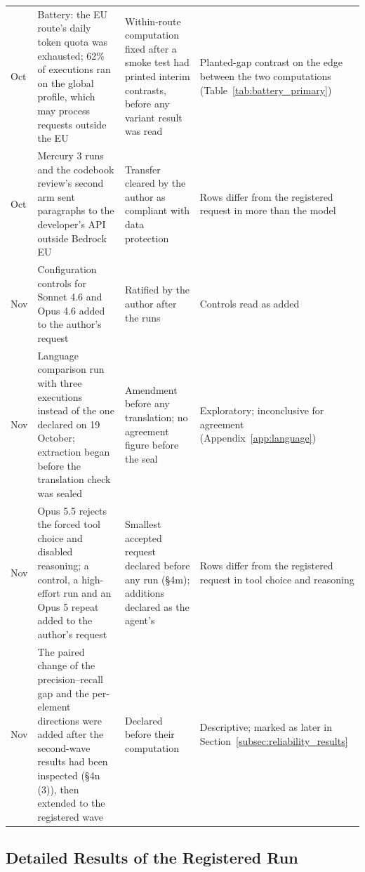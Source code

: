\begin{longtable}{@{}>{\raggedright\arraybackslash}p{16mm}>{\raggedright\arraybackslash}p{54mm}>{\raggedright\arraybackslash}p{42mm}>{\raggedright\arraybackslash}p{38mm}@{}}
30 Oct & Battery: the EU route's daily token quota was exhausted; 62\% of executions ran on the global profile, which may process requests outside the EU & Within-route computation fixed after a smoke test had printed interim contrasts, before any variant result was read & Planted-gap contrast on the edge between the two computations (Table~\ref{tab:battery_primary}) \\
30 Oct & Mercury 3 runs and the codebook review's second arm sent paragraphs to the developer's API outside Bedrock EU & Transfer cleared by the author as compliant with data protection & Rows differ from the registered request in more than the model \\
1 Nov & Configuration controls for Sonnet 4.6 and Opus 4.6 added to the author's request & Ratified by the author after the runs & Controls read as added \\
5 Nov & Language comparison run with three executions instead of the one declared on 19 October; extraction began before the translation check was sealed & Amendment before any translation; no agreement figure before the seal & Exploratory; inconclusive for agreement (Appendix~\ref{app:language}) \\
8 Nov & Opus 5.5 rejects the forced tool choice and disabled reasoning; a control, a high-effort run and an Opus 5 repeat added to the author's request & Smallest accepted request declared before any run (\S4m); additions declared as the agent's & Rows differ from the registered request in tool choice and reasoning \\
10 Nov & The paired change of the precision--recall gap and the per-element directions were added after the second-wave results had been inspected (\S4n (3)), then extended to the registered wave & Declared before their computation & Descriptive; marked as later in Section~\ref{subsec:reliability_results} \\
\end{longtable}
\endgroup

\subsection{Detailed Results of the Registered Run}\label{app:detailed_results}

